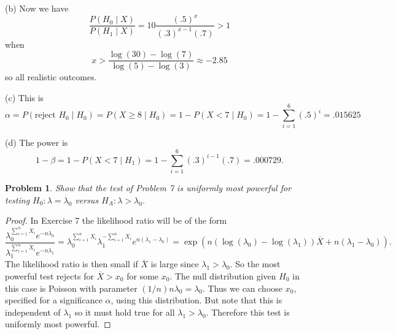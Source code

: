 \documentclass{article}
\newtheorem{problem}{Problem}
\begin{document}
(b) Now we have
\[
\frac{P(H_0 \mid X)}{P(H_1 \mid X)} = 10 \frac{(.5)^x}{(.3)^{x-1}(.7)} > 1
\]
when
\[
x > \frac{\log(30) - \log(7)}{\log(5) - \log(3)} \approx -2.85
\]
so all realistic outcomes.

(c) This is
\[
\alpha = P(\text{reject } H_0 \mid H_0) = P(X \geq 8 \mid H_0) = 1 - P(X < 7 \mid H_0) = 1 - \sum_{i=1}^6 (.5)^i = .015625
\]

(d) The power is
\[
1 - \beta = 1 - P(X < 7 \mid H_1) = 1 - \sum_{i=1}^6 (.3)^{i-1}(.7) = .000729.
\]

\begin{problem}
Show that the test of Problem 7 is uniformly most powerful for testing $H_0 : \lambda = \lambda_0$ versus $H_A : \lambda > \lambda_0$.
\end{problem}
\begin{proof}
In Exercise 7 the likelihood ratio will be of the form
\[
\frac{\lambda_0^{\sum_{i=1}^n X_i} e^{-n\lambda_0}}{\lambda_1^{\sum_{i=1}^n X_i} e^{-n\lambda_1}} = \lambda_0^{\sum_{i=1}^n X_i} \lambda_1^{-\sum_{i=1}^n X_i} e^{n(\lambda_1 - \lambda_0)} = \exp \left ( n(\log (\lambda_0) - \log (\lambda_1)) \overline{X} + n (\lambda_1 - \lambda_0) \right ).
\]
The likelihood ratio is then small if $\overline{X}$ is large since $\lambda_1 > \lambda_0$. So the most powerful test rejects for $\overline{X} > x_0$ for some $x_0$. The null distribution given $H_0$ in this case is Poisson with parameter $(1/n) n\lambda_0 = \lambda_0$. Thus we can choose $x_0$, specified for a significance $\alpha$, using this distribution. But note that this is independent of $\lambda_1$ so it must hold true for all $\lambda_1 > \lambda_0$. Therefore this test is uniformly most powerful.
\end{proof}
\end{document}
